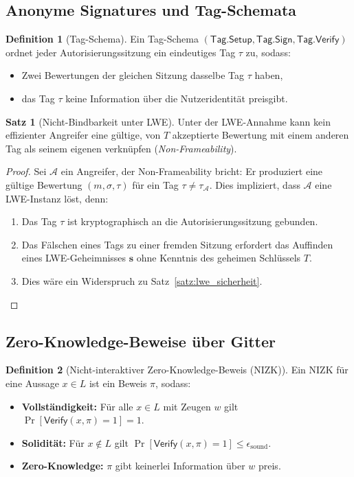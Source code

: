 ﻿\documentclass[a4paper,12pt]{article}
\theoremstyle{definition}
\newtheorem{definition}{Definition}
\newtheorem{satz}{Satz}
\begin{document}
\subsection{Anonyme Signatures und Tag-Schemata}

\begin{definition}[Tag-Schema]
Ein Tag-Schema $(\mathsf{Tag.Setup}, \mathsf{Tag.Sign}, \mathsf{Tag.Verify})$ ordnet
jeder Autorisierungssitzung ein eindeutiges Tag $\tau$ zu, sodass:
\begin{itemize}
    \item Zwei Bewertungen der gleichen Sitzung dasselbe Tag $\tau$ haben,
    \item das Tag $\tau$ keine Information über die Nutzeridentität preisgibt.
\end{itemize}
\end{definition}

\begin{satz}[Nicht-Bindbarkeit unter LWE]
\label{satz:non_frameability}
Unter der LWE-Annahme kann kein effizienter Angreifer
eine gültige, von $T$ akzeptierte Bewertung mit einem anderen Tag als seinem eigenen
verknüpfen (\emph{Non-Frameability}).
\end{satz}

\begin{proof}
Sei $\mathcal{A}$ ein Angreifer, der Non-Frameability bricht:
Er produziert eine gültige Bewertung $(m, \sigma, \tau)$ für ein Tag $\tau \neq \tau_{\mathcal{A}}$.
Dies impliziert, dass $\mathcal{A}$ eine LWE-Instanz löst, denn:
\begin{enumerate}
    \item Das Tag $\tau$ ist kryptographisch an die Autorisierungssitzung gebunden.
    \item Das Fälschen eines Tags zu einer fremden Sitzung erfordert das Auffinden eines
          LWE-Geheimnisses $\mathbf{s}$ ohne Kenntnis des geheimen Schlüssels $T$.
    \item Dies wäre ein Widerspruch zu Satz~\ref{satz:lwe_sicherheit}.
\end{enumerate}
\end{proof}

\subsection{Zero-Knowledge-Beweise über Gitter}

\begin{definition}[Nicht-interaktiver Zero-Knowledge-Beweis (NIZK)]
Ein NIZK für eine Aussage $x \in L$ ist ein Beweis $\pi$, sodass:
\begin{itemize}
    \item \textbf{Vollständigkeit:} Für alle $x \in L$ mit Zeugen $w$ gilt $\Pr[\mathsf{Verify}(x, \pi) = 1] = 1$.
    \item \textbf{Solidität:} Für $x \notin L$ gilt $\Pr[\mathsf{Verify}(x, \pi) = 1] \leq \epsilon_{\mathrm{sound}}$.
    \item \textbf{Zero-Knowledge:} $\pi$ gibt keinerlei Information über $w$ preis.
\end{itemize}
\end{definition}
\end{document}
